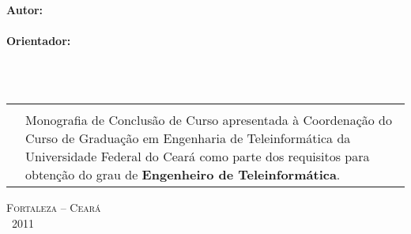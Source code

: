 \thispagestyle{empty}%

\begin{center}
    \null\vfill%
    \vspace{.25cm}%
    {\normalsize    \textbf{Autor:} \\%
                    \upshape{\autor}
                    }\\%

    \null\vfill%
    \vspace{.25cm}%
    {\normalsize    \textbf{Orientador:} \\%
                    \upshape{\orientador}
                    } \\%
    \null\vfill%
    \vspace{.25cm}%

    \vspace{.25cm}%
    {\large         \titulo\\}

    \null\vfill%
    \vspace{.25cm}%
    \begin{tabularx}{\textwidth}{XX}

    \null\vfill \\
    &
    Monografia de Conclus\~{a}o de Curso apresentada \`{a} Coordena\c{c}\~{a}o do Curso de Gradua\c{c}\~{a}o em Engenharia de Teleinform\'{a}tica da Universidade Federal do Cear\'{a} como parte dos requisitos para obten\c{c}\~{a}o do grau de \textbf{Engenheiro de Teleinform\'{a}tica}. \\

    \end{tabularx}

    \null\vfill%
    \vspace{.25cm}%

    {\normalsize    \textsc{Fortaleza -- Cear\'{a} \\%
                            \monthname~2011}}
\end{center}
